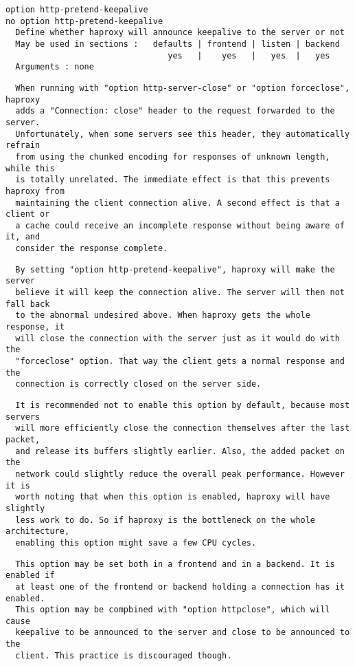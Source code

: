 \begin{verbatim}
option http-pretend-keepalive
no option http-pretend-keepalive
  Define whether haproxy will announce keepalive to the server or not
  May be used in sections :   defaults | frontend | listen | backend
                                 yes   |    yes   |   yes  |   yes
  Arguments : none
\end{verbatim}

\begin{verbatim}
  When running with "option http-server-close" or "option forceclose", haproxy
  adds a "Connection: close" header to the request forwarded to the server.
  Unfortunately, when some servers see this header, they automatically refrain
  from using the chunked encoding for responses of unknown length, while this
  is totally unrelated. The immediate effect is that this prevents haproxy from
  maintaining the client connection alive. A second effect is that a client or
  a cache could receive an incomplete response without being aware of it, and
  consider the response complete.
\end{verbatim}

\begin{verbatim}
  By setting "option http-pretend-keepalive", haproxy will make the server
  believe it will keep the connection alive. The server will then not fall back
  to the abnormal undesired above. When haproxy gets the whole response, it
  will close the connection with the server just as it would do with the
  "forceclose" option. That way the client gets a normal response and the
  connection is correctly closed on the server side.
\end{verbatim}

\begin{verbatim}
  It is recommended not to enable this option by default, because most servers
  will more efficiently close the connection themselves after the last packet,
  and release its buffers slightly earlier. Also, the added packet on the
  network could slightly reduce the overall peak performance. However it is
  worth noting that when this option is enabled, haproxy will have slightly
  less work to do. So if haproxy is the bottleneck on the whole architecture,
  enabling this option might save a few CPU cycles.
\end{verbatim}

\begin{verbatim}
  This option may be set both in a frontend and in a backend. It is enabled if
  at least one of the frontend or backend holding a connection has it enabled.
  This option may be compbined with "option httpclose", which will cause
  keepalive to be announced to the server and close to be announced to the
  client. This practice is discouraged though.
\end{verbatim}

